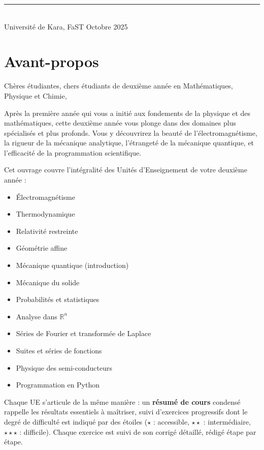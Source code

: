 \documentclass[12pt,a4paper]{article}
\begin{document}
\begin{titlepage}
\vspace{0.5cm}
\rule{\textwidth}{0.4pt}\\[0.15cm]
{\small Université de Kara, FaST \hfill Octobre 2025}

\end{titlepage}

\newpage
\thispagestyle{plain}
\pagestyle{fancy}

\section*{Avant-propos}

Chères étudiantes, chers étudiants de deuxième année en Mathématiques, Physique et Chimie,

Après la première année qui vous a initié aux fondements de la physique et des mathématiques, cette deuxième année vous plonge dans des domaines plus spécialisés et plus profonds. Vous y découvrirez la beauté de l'électromagnétisme, la rigueur de la mécanique analytique, l'étrangeté de la mécanique quantique, et l'efficacité de la programmation scientifique.

Cet ouvrage couvre l'intégralité des Unités d'Enseignement de votre deuxième année :

\begin{itemize}
  \item Électromagnétisme
  \item Thermodynamique
  \item Relativité restreinte
  \item Géométrie affine
  \item Mécanique quantique (introduction)
  \item Mécanique du solide
  \item Probabilités et statistiques
  \item Analyse dans $\mathbb{R}^n$
  \item Séries de Fourier et transformée de Laplace
  \item Suites et séries de fonctions
  \item Physique des semi-conducteurs
  \item Programmation en Python
\end{itemize}

Chaque UE s'articule de la même manière : un \textbf{résumé de cours} condensé rappelle les résultats essentiels à maîtriser, suivi d'exercices progressifs dont le degré de difficulté est indiqué par des étoiles ($\star$ : accessible, $\star\star$ : intermédiaire, $\star\star\star$ : difficile). Chaque exercice est suivi de son corrigé détaillé, rédigé étape par étape.
\end{document}
